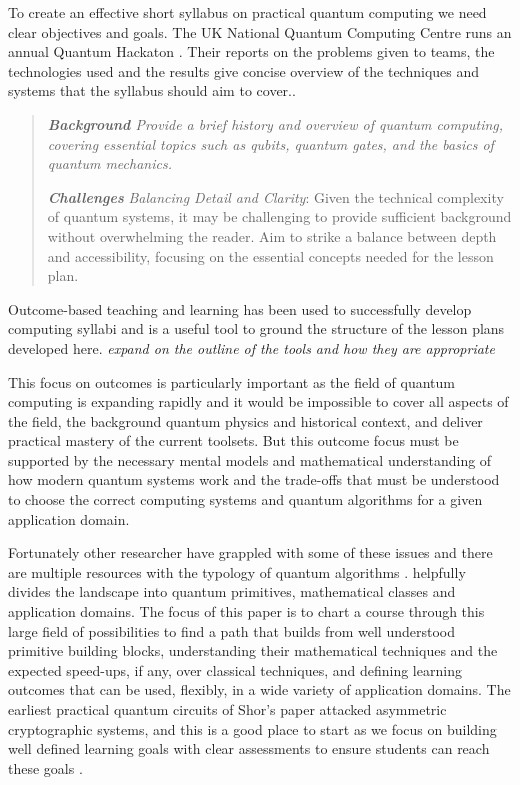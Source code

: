 To create an effective short syllabus on practical quantum computing we need clear objectives and goals.  
The UK National Quantum Computing Centre runs an annual Quantum Hackaton \cite{NQCC:2024}.
Their reports on the problems given to teams, the technologies used and the results give concise overview of the 
techniques and systems that the syllabus should aim to cover.\cite{NQCC:2023}.

\begin{quote}\itshape
	\textbf{\emph{Background}}
	Provide a brief history and overview of quantum computing, covering essential topics such as qubits, quantum gates, and the basics of quantum mechanics. 
	
	\textbf{\emph{Challenges}}
	\emph{Balancing Detail and Clarity}: Given the technical complexity of quantum systems, it may be challenging to provide sufficient background without overwhelming the reader. Aim to strike a balance between depth and accessibility, focusing on the essential concepts needed for the lesson plan.
\end{quote}\ignorespacesafterend


Outcome-based teaching and learning \cite{Spady:1982} has been used to successfully develop computing syllabi \cite{Wong:2011}
and is a useful tool to ground the structure of the lesson plans developed here. \emph{expand on the outline of the tools and how they are appropriate}

This focus on outcomes is particularly important as the field of quantum computing is expanding rapidly and it would be impossible to cover all
aspects of the field, the background quantum physics and historical context, and deliver practical mastery of the current toolsets.
But this outcome focus must be supported by the necessary mental models and mathematical understanding of how modern quantum systems work and 
the trade-offs that must be understood to choose the correct computing systems and quantum algorithms for a given application domain.

Fortunately other researcher have grappled with some of these issues and there are multiple resources with the typology of quantum algorithms
\cite{Arnault:2024} \cite{Montanaro:2016}.  \citeauthor{Arnault:2024} helpfully divides the landscape into quantum primitives, mathematical 
classes and application domains.  
The focus of this paper is to chart a course through this large field of possibilities to find a path that builds from well understood 
primitive building blocks, understanding their mathematical techniques and the expected speed-ups, if any, over classical techniques,
and defining learning outcomes that can be used, flexibly, in a wide variety of application domains.  
The earliest practical quantum circuits of Shor's paper attacked asymmetric cryptographic systems, and this is a good place to start
as we focus on building well defined learning goals with clear assessments to ensure students can reach these goals \cite{Spady:1982}.


